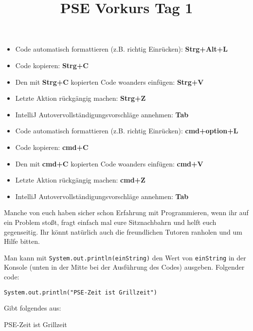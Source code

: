 \documentclass{../../sheet}
\title{PSE Vorkurs Tag 1}
\begin{document}
\maketitle

\begin{itemize}
    \item Code automatisch formattieren (z.B. richtig Einrücken): \textbf{Strg+Alt+L}
    \item Code kopieren: \textbf{Strg+C}
    \item Den mit \textbf{Strg+C} kopierten Code woanders einfügen: \textbf{Strg+V}
    \item Letzte Aktion rückgängig machen: \textbf{Strg+Z}
    \item IntelliJ Autovervollständigungsvorschläge annehmen: \textbf{Tab}
\end{itemize}

\begin{itemize}
    \item Code automatisch formattieren (z.B. richtig Einrücken): \textbf{cmd+option+L}
    \item Code kopieren: \textbf{cmd+C}
    \item Den mit \textbf{cmd+C} kopierten Code woanders einfügen: \textbf{cmd+V}
    \item Letzte Aktion rückgängig machen: \textbf{cmd+Z}
    \item IntelliJ Autovervollständigungsvorschläge annehmen: \textbf{Tab}
\end{itemize}

Manche von euch haben sicher schon Erfahrung mit Programmieren, wenn ihr auf ein Problem stoßt, fragt einfach mal eure Sitznachbahrn und helft euch gegenseitig. Ihr könnt natürlich auch die freundlichen Tutoren ranholen und um Hilfe bitten.
\newpage


Man kann mit \texttt{System.out.println(einString)} den Wert von \texttt{einString} in der Konsole (unten in der Mitte bei der Ausführung des Codes) ausgeben. Folgender code:
\begin{verbatim}
System.out.println("PSE-Zeit ist Grillzeit")
\end{verbatim}
Gibt folgendes aus:
\begin{ausgabe}
    PSE-Zeit ist Grillzeit
\end{ausgabe}
\end{document}
